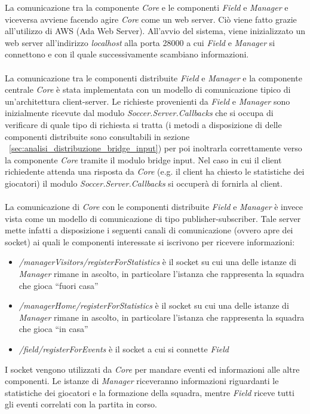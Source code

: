 La comunicazione tra la componente \emph{Core} e le componenti \emph{Field} e \emph{Manager} e viceversa avviene facendo agire \emph{Core} come un web server. Ci\`{o} viene fatto grazie all'utilizzo di AWS (Ada Web Server). All'avvio del sistema, viene inizializzato un web server all'indirizzo \emph{localhost} alla porta 28000 a cui \emph{Field} e \emph{Manager} si connettono e con il quale successivamente scambiano informazioni.\\\\ 
La comunicazione tra le componenti distribuite \emph{Field} e \emph{Manager} e la componente centrale \emph{Core} \`{e} stata implementata con un modello di comunicazione tipico di un’architettura client-server. Le richieste provenienti da \emph{Field} e \emph{Manager} sono inizialmente ricevute dal modulo \emph{Soccer.Server.Callbacks} che si occupa di verificare di quale tipo di richiesta si tratta (i metodi a disposizione di delle componenti distribuite sono consultabili in sezione ~\ref{sec:analisi_distribuzione_bridge_input}) per poi inoltrarla correttamente verso la componente \emph{Core} tramite il modulo bridge input. Nel caso in cui il client richiedente attenda una risposta da \emph{Core} (e.g. il client ha chiesto le statistiche dei giocatori) il modulo \emph{Soccer.Server.Callbacks} si occuper\`{a} di fornirla al client.\\\\
La comunicazione di \emph{Core} con le componenti distribuite \emph{Field} e \emph{Manager} \`{e} invece vista come un modello di comunicazione di tipo publisher-subscriber. Tale server mette infatti a disposizione i seguenti canali di comunicazione (ovvero apre dei socket) ai quali le componenti interessate si iscrivono per ricevere informazioni:
\begin{itemize}
\item \emph{/managerVisitors/registerForStatistics} \`{e} il socket su cui una delle istanze di \emph{Manager} rimane in ascolto, in particolare l'istanza che rappresenta la squadra che gioca ``fuori casa''
\item \emph{/managerHome/registerForStatistics} \`{e} il socket su cui una delle istanze di \emph{Manager} rimane in ascolto, in particolare l'istanza che rappresenta la squadra che gioca ``in casa''
\item \emph{/field/registerForEvents} \`{e} il socket a cui si connette \emph{Field}
\end{itemize}

\noindent I socket vengono utilizzati da \emph{Core} per mandare eventi ed informazioni alle altre componenti. Le istanze di \emph{Manager} riceveranno informazioni riguardanti le statistiche dei giocatori e la formazione della squadra, mentre \emph{Field} riceve tutti gli eventi correlati con la partita in corso. 

